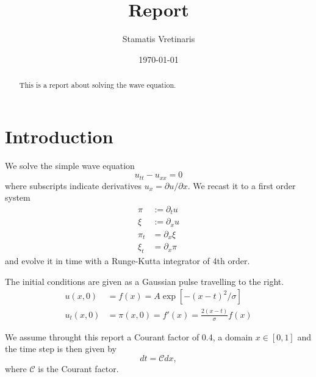 \documentclass[reprint, prd, nofootinbib, superscriptaddress, floatfix]{revtex4-2}  %
\begin{document}
\title{Report}

\author{Stamatis Vretinaris}


\date{\today}

\begin{abstract}
This is a report about solving the wave equation.
\end{abstract}

\maketitle
\section{Introduction}
We solve the simple wave equation
\begin{equation}
  \label{eq:wave-equation}
  u_{tt} - u_{xx} = 0
\end{equation}
where subscripts indicate derivatives $u_x = \partial u /\partial x$. We recast it to a first order system
\begin{align}
  \label{eq:1st-order-system}
  \pi &:= \partial_t u \nonumber \\
  \xi &:= \partial_x u \\
  \pi_t &= \partial_x \xi \nonumber\\
  \xi_t &= \partial_x \pi \nonumber
\end{align}
and evolve it in time with a Runge-Kutta integrator of 4th order.

The initial conditions are given as a Gaussian pulse travelling to the right.
\begin{align}
  \label{eq:initial-conditions}
  u(x,0) &= f(x) = A \exp[-(x-t)^2/\sigma] \\
  u_t(x,0) &= \pi(x,0) = f'(x) = \frac{2 (x-t)}{\sigma} f(x)
\end{align}

We assume throught this report a Courant factor of 0.4, a domain $x\in[0,1]$ and the time step is then given by
\begin{equation}
  \label{eq:timestep}
  dt = \mathcal{C} dx,
\end{equation}
where $\mathcal{C}$ is the Courant factor.
\end{document}
